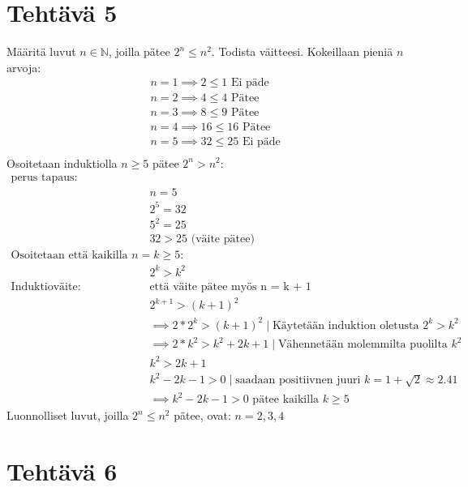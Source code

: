 \documentclass{article}
\begin{document}
	\section*{Tehtävä 5}
    Määritä luvut $n \in \mathbb{N}$, joilla pätee $2^n \leq n^2$. Todista väitteesi.
    \newline
    \newline
    Kokeillaan pieniä $n$ arvoja:
    \[
        \begin{aligned}
            &n = 1 \implies 2 \leq 1 \text{ Ei päde}\\
            &n = 2 \implies 4 \leq 4 \text{ Pätee}\\
            &n = 3 \implies 8 \leq 9 \text{ Pätee}\\
            &n = 4 \implies 16 \leq 16 \text{ Pätee}\\
            &n = 5 \implies 32 \leq 25 \text{ Ei päde}\\
        \end{aligned}
    \]
    Osoitetaan induktiolla $n \geq 5$ pätee $2^n > n^2  $:
    \[
        \begin{aligned}
            \text{perus tapaus:}&\\
            &n = 5\\
            &2^5 = 32\\
            &5^2 = 25\\
            &32 > 25 \text{ (väite pätee)}\\[10pt]
            \text{Osoitetaan että kaikilla $n = k \geq 5$:}&\\
            &2^k > k^2\\
            \text{Induktioväite: Todistetaan, } & \text{että väite pätee myös n = k + 1}\\
            &2^{k+1} > (k+1)^2\\
            &\implies 2 * 2^k > (k + 1)^2 \mid \text{Käytetään induktion oletusta } 2^k > k^2\\
            &\implies 2 * k^2 > k^2 + 2k + 1 \mid \text{Vähennetään molemmilta puolilta } k^2\\
            &k^2 > 2k + 1\\
            &k^2 - 2k - 1 > 0 \mid \text{saadaan positiivnen juuri } k = 1 + \sqrt{2} \approx 2.41\\
            &\implies k^2 - 2k - 1 > 0 \text{ pätee kaikilla }k \geq 5 
        \end{aligned}
    \]
    Luonnolliset luvut, joilla  $2^n \leq n^2$ pätee, ovat:
    \newline
    $n = 2, 3, 4$

    \newpage
	\section*{Tehtävä 6}
\end{document}
